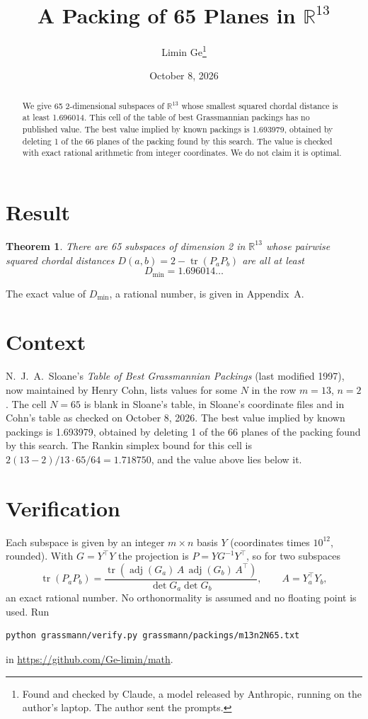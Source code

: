 \documentclass[11pt,a4paper]{article}
\title{A Packing of 65 Planes in $\mathbb{R}^{13}$}
\author{Limin Ge\thanks{Found and checked by Claude, a model released by Anthropic, running on the author's laptop. The author sent the prompts.}}
\date{October 8, 2026}
\newtheorem*{theorem}{Theorem}
\begin{document}
\maketitle
\begin{abstract}
We give 65 2-dimensional subspaces of $\mathbb{R}^{13}$ whose smallest squared chordal distance is at least 1.696014. This cell of the table of best Grassmannian packings has no published value. The best value implied by known packings is 1.693979, obtained by deleting 1 of the 66 planes of the packing found by this search. The value is checked with exact rational arithmetic from integer coordinates. We do not claim it is optimal.
\end{abstract}

\section{Result}
\begin{theorem}
There are 65 subspaces of dimension 2 in $\mathbb{R}^{13}$ whose pairwise squared chordal distances $D(a,b) = 2 - \operatorname{tr}(P_aP_b)$ are all at least
\[ D_{\min} = 1.696014\ldots \]
\end{theorem}
The exact value of $D_{\min}$, a rational number, is given in Appendix~A.


\section{Context}
N.~J.~A.~Sloane's \emph{Table of Best Grassmannian Packings} (last modified 1997), now maintained by Henry Cohn, lists values for some $N$ in the row $m=13$, $n=2$. The cell $N=65$ is blank in Sloane's table, in Sloane's coordinate files and in Cohn's table as checked on October 8, 2026. The best value implied by known packings is 1.693979, obtained by deleting 1 of the 66 planes of the packing found by this search. The Rankin simplex bound for this cell is $2(13-2)/13\cdot 65/64 = 1.718750$, and the value above lies below it.


\section{Verification}
Each subspace is given by an integer $m\times n$ basis $Y$ (coordinates times $10^{12}$, rounded). With $G=Y^\top Y$ the projection is $P=YG^{-1}Y^\top$, so for two subspaces
\[ \operatorname{tr}(P_aP_b)=\frac{\operatorname{tr}(\operatorname{adj}(G_a)\,A\,\operatorname{adj}(G_b)\,A^\top)}{\det G_a\det G_b},\qquad A=Y_a^\top Y_b, \]
an exact rational number. No orthonormality is assumed and no floating point is used. Run
\begin{verbatim}
python grassmann/verify.py grassmann/packings/m13n2N65.txt
\end{verbatim}
in \url{https://github.com/Ge-limin/math}.
\end{document}

